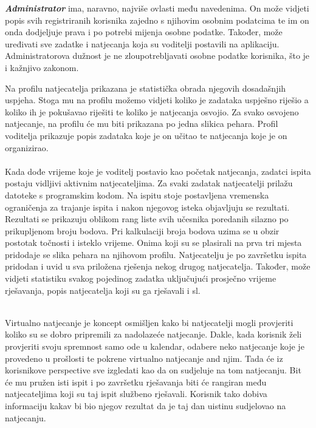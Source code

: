 	    \textbf{\textit{Administrator}} ima, naravno, najviše ovlasti među navedenima. On može vidjeti popis svih registriranih korisnika zajedno s njihovim osobnim podatcima te im on onda dodjeljuje prava i po potrebi mijenja osobne podatke. Također, može uređivati sve zadatke i natjecanja koja su voditelji postavili na aplikaciju. Administratorova dužnost je ne zloupotrebljavati osobne podatke korisnika, što je i kažnjivo zakonom.
	    
	    Na profilu natjecatelja prikazana je statistička obrada njegovih dosadašnjih uspjeha. Stoga mu na profilu možemo vidjeti koliko je zadataka uspješno riješio a koliko ih je pokušavao riješiti te koliko je natjecanja osvojio. Za svako osvojeno natjecanje, na profilu će mu biti prikazana po jedna slikica pehara.
	    Profil voditelja prikazuje popis zadataka koje je on učitao te natjecanja koje je on organizirao. \\
	
		\\
		Kada dođe vrijeme koje je voditelj postavio kao početak natjecanja, zadatci ispita postaju vidljivi aktivnim natjecateljima. Za svaki zadatak natjecatelji prilažu datoteke s programskim kodom. Na ispitu stoje postavljena vremenska ograničenja za trajanje ispita i nakon njegovog isteka objavljuju se rezultati. Rezultati se prikazuju oblikom rang liste svih učesnika poredanih silazno po prikupljenom broju bodova. Pri kalkulaciji broja bodova uzima se u obzir postotak točnosti i isteklo vrijeme. Onima koji su se plasirali na prva tri mjesta pridodaje se slika pehara na njihovom profilu.
		Natjecatelju je po završetku ispita pridodan i uvid u sva priložena rješenja nekog drugog natjecatelja. Također, može vidjeti statistiku svakog pojedinog zadatka uključujući prosječno vrijeme rješavanja, popis natjecatelja koji su ga rješavali i sl.
		
		
		\\
		Virtualno natjecanje je koncept osmišljen kako bi natjecatelji mogli provjeriti koliko su se dobro pripremili za nadolazeće natjecanje. Dakle, kada korisnik želi provjeriti svoju spremnost samo ode u kalendar, odabere neko natjecanje koje je provedeno u prošlosti te pokrene virtualno natjecanje and njim. Tada će iz korisnikove perspective sve izgledati kao da on sudjeluje na tom natjecanju. Bit će mu pružen isti ispit i po završetku rješavanja biti će rangiran među natjecateljima koji su taj ispit službeno rješavali. Korisnik tako dobiva informaciju kakav bi bio njegov rezultat da je taj dan uistinu sudjelovao na natjecanju.\\
		
